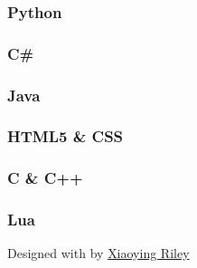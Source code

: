 \documentclass[english,]{article}
\begin{document}
\hypertarget{python}{%
\subsubsection{Python}\label{python}}

\hypertarget{c}{%
\subsubsection{C\#}\label{c}}

\hypertarget{java}{%
\subsubsection{Java}\label{java}}

\hypertarget{html5-css}{%
\subsubsection{HTML5 \& CSS}\label{html5-css}}

\hypertarget{c-c}{%
\subsubsection{C \& C++}\label{c-c}}

\hypertarget{lua}{%
\subsubsection{Lua}\label{lua}}

{Designed with \emph{} by \href{http://themes.3rdwavemedia.com}{Xiaoying
Riley}}
\end{document}
